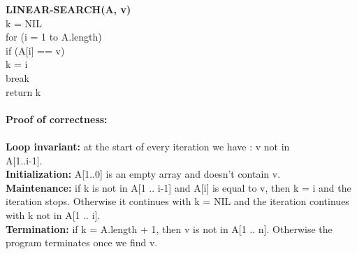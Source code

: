 \documentclass{article}
\begin{document}
\noindent\textbf{LINEAR-SEARCH(A, v)}\\
\indent k = NIL\\
\indent for (i = 1 to A.length)\\
\indent\indent if (A[i] == v)\\
\indent\indent\indent k = i\\
\indent\indent\indent break\\
\indent return k\\\\

\noindent\textbf{Proof of correctness:}\\\\
\noindent\textbf{Loop invariant:} at the start of every iteration we have : v not in \\A[1..i-1].\\
\textbf{Initialization:} A[1..0] is an empty array and doesn't contain v.\\
\textbf{Maintenance:} if k is not in A[1 .. i-1] and A[i] is equal to v, then k = i and the iteration stops. Otherwise it continues with k = NIL and the iteration continues with k not in A[1 .. i].\\
\textbf{Termination:} if k = A.length + 1, then v is not in A[1 .. n]. Otherwise the program terminates once we find v.
\end{document}
